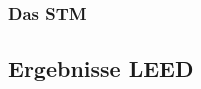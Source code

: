 \documentclass{beamer}
\begin{document}
\begin{frame}
\frametitle{Das STM}
\begin{figure}[H]
\centering
\sffamily

\end{figure}
\end{frame}



\subsection[Ergebnisse]{Ergebnisse LEED}
\end{document}
